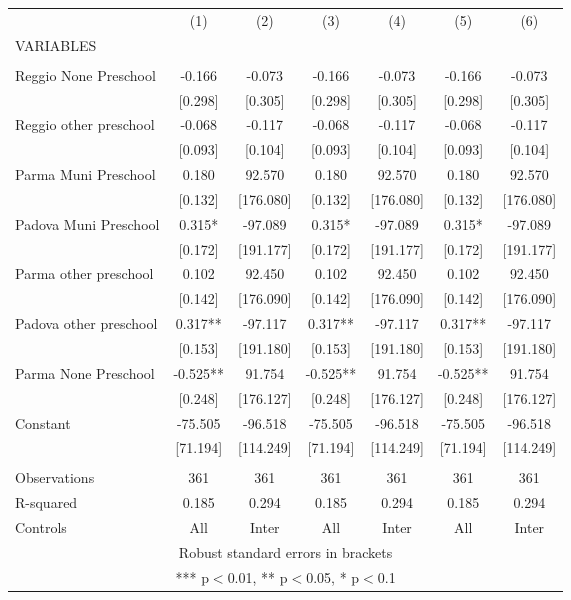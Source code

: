 \begin{tabular}{lcccccc} \hline
 & (1) & (2) & (3) & (4) & (5) & (6) \\
VARIABLES &  &  &  &  &  &  \\ \hline
 &  &  &  &  &  &  \\
Reggio None Preschool & -0.166 & -0.073 & -0.166 & -0.073 & -0.166 & -0.073 \\
 & [0.298] & [0.305] & [0.298] & [0.305] & [0.298] & [0.305] \\
Reggio other preschool & -0.068 & -0.117 & -0.068 & -0.117 & -0.068 & -0.117 \\
 & [0.093] & [0.104] & [0.093] & [0.104] & [0.093] & [0.104] \\
Parma Muni Preschool & 0.180 & 92.570 & 0.180 & 92.570 & 0.180 & 92.570 \\
 & [0.132] & [176.080] & [0.132] & [176.080] & [0.132] & [176.080] \\
Padova Muni Preschool & 0.315* & -97.089 & 0.315* & -97.089 & 0.315* & -97.089 \\
 & [0.172] & [191.177] & [0.172] & [191.177] & [0.172] & [191.177] \\
Parma other preschool & 0.102 & 92.450 & 0.102 & 92.450 & 0.102 & 92.450 \\
 & [0.142] & [176.090] & [0.142] & [176.090] & [0.142] & [176.090] \\
Padova other preschool & 0.317** & -97.117 & 0.317** & -97.117 & 0.317** & -97.117 \\
 & [0.153] & [191.180] & [0.153] & [191.180] & [0.153] & [191.180] \\
Parma None Preschool & -0.525** & 91.754 & -0.525** & 91.754 & -0.525** & 91.754 \\
 & [0.248] & [176.127] & [0.248] & [176.127] & [0.248] & [176.127] \\
Constant & -75.505 & -96.518 & -75.505 & -96.518 & -75.505 & -96.518 \\
 & [71.194] & [114.249] & [71.194] & [114.249] & [71.194] & [114.249] \\
 &  &  &  &  &  &  \\
Observations & 361 & 361 & 361 & 361 & 361 & 361 \\
R-squared & 0.185 & 0.294 & 0.185 & 0.294 & 0.185 & 0.294 \\
 Controls & All & Inter & All & Inter & All & Inter \\ \hline
\multicolumn{7}{c}{ Robust standard errors in brackets} \\
\multicolumn{7}{c}{ *** p$<$0.01, ** p$<$0.05, * p$<$0.1} \\
\end{tabular}
